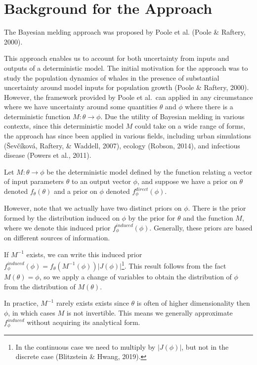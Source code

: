 \documentclass[12pt,twoside]{smiththesis}
\begin{document}
\hypertarget{background-for-the-approach}{%
\section{Background for the Approach}\label{background-for-the-approach}}

The Bayesian melding approach was proposed by Poole et al. (Poole \& Raftery, 2000).

This approach enables us to account for both uncertainty from inputs and outputs of a deterministic model. The initial motivation for the approach was to study the population dynamics of whales in the presence of substantial uncertainty around model inputs for population growth (Poole \& Raftery, 2000). However, the framework provided by Poole et al.~can applied in any circumstance where we have uncertainty around some quantities \(\theta\) and \(\phi\) where there is a deterministic function \(M:\theta \to\phi\). Due the utility of Bayesian melding in various contexts, since this deterministic model \(M\) could take on a wide range of forms, the approach has since been applied in various fields, including urban simulations (Ševčíková, Raftery, \& Waddell, 2007), ecology (Robson, 2014), and infectious disease (Powers et al., 2011).

Let \(M: \theta \to \phi\) be the deterministic model defined by the function relating a vector of input parameters \(\theta\) to an output vector \(\phi\), and suppose we have a prior on \(\theta\) denoted \(f_\theta(\theta)\) and a prior on \(\phi\) denoted \(f_\phi^{direct}(\phi)\).

However, note that we actually have two distinct priors on \(\phi\). There is the prior formed by the distribution induced on \(\phi\) by the prior for \(\theta\) and the function \(M\), where we denote this induced prior \(f_\phi^{induced}(\phi)\). Generally, these priors are based on different sources of information.

If \(M^{-1}\) exists, we can write this induced prior \(f_\phi^{induced}(\phi) = f_\theta(M^{-1}(\phi)) |J(\phi)|\)\footnote{In the continuous case we need to multiply by \(|J(\phi)|\), but not in the discrete case (Blitzstein \& Hwang, 2019).}. This result follows from the fact \(M(\theta) = \phi\), so we apply a change of variables to obtain the distribution of \(\phi\) from the distribution of \(M(\theta)\).

In practice, \(M^{-1}\) rarely exists exists since \(\theta\) is often of higher dimensionality then \(\phi\), in which cases \(M\) is not invertible. This means we generally approximate \(f_\phi^{induced}\) without acquiring its analytical form.
\end{document}
